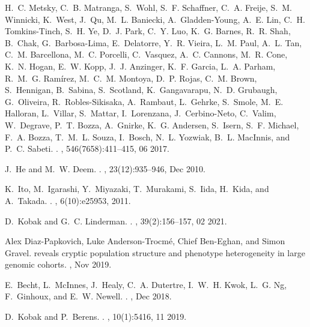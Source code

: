 \documentclass[webpdf,contemporary,large,single]{oup-authoring-template}%
\theoremstyle{thmstyleone}%
\theoremstyle{thmstyletwo}%
\theoremstyle{thmstylethree}%
\begin{document}
\begin{thebibliography}{10}
H.~C. Metsky, C.~B. Matranga, S.~Wohl, S.~F. Schaffner, C.~A. Freije, S.~M.
  Winnicki, K.~West, J.~Qu, M.~L. Baniecki, A.~Gladden-Young, A.~E. Lin, C.~H.
  Tomkins-Tinch, S.~H. Ye, D.~J. Park, C.~Y. Luo, K.~G. Barnes, R.~R. Shah,
  B.~Chak, G.~Barbosa-Lima, E.~Delatorre, Y.~R. Vieira, L.~M. Paul, A.~L. Tan,
  C.~M. Barcellona, M.~C. Porcelli, C.~Vasquez, A.~C. Cannons, M.~R. Cone,
  K.~N. Hogan, E.~W. Kopp, J.~J. Anzinger, K.~F. Garcia, L.~A. Parham, R.~M.~G.
  Ram\'{i}rez, M.~C.~M. Montoya, D.~P. Rojas, C.~M. Brown, S.~Hennigan,
  B.~Sabina, S.~Scotland, K.~Gangavarapu, N.~D. Grubaugh, G.~Oliveira,
  R.~Robles-Sikisaka, A.~Rambaut, L.~Gehrke, S.~Smole, M.~E. Halloran,
  L.~Villar, S.~Mattar, I.~Lorenzana, J.~Cerbino-Neto, C.~Valim, W.~Degrave,
  P.~T. Bozza, A.~Gnirke, K.~G. Andersen, S.~Isern, S.~F. Michael, F.~A. Bozza,
  T.~M.~L. Souza, I.~Bosch, N.~L. Yozwiak, B.~L. MacInnis, and P.~C. Sabeti.
.
, 546(7658):411--415, 06 2017.

J.~He and M.~W. Deem.
.
, 23(12):935--946, Dec 2010.

K.~Ito, M.~Igarashi, Y.~Miyazaki, T.~Murakami, S.~Iida, H.~Kida, and A.~Takada.
.
, 6(10):e25953, 2011.

D.~Kobak and G.~C. Linderman.
.
, 39(2):156--157, 02 2021.

Alex Diaz-Papkovich, Luke Anderson-Trocm\'{e}, Chief Ben-Eghan, and Simon
  Gravel.
 reveals cryptic population structure and phenotype
  heterogeneity in large genomic cohorts.
, Nov 2019.

E.~Becht, L.~McInnes, J.~Healy, C.~A. Dutertre, I.~W.~H. Kwok, L.~G. Ng,
  F.~Ginhoux, and E.~W. Newell.
.
, Dec 2018.

D.~Kobak and P.~Berens.
.
, 10(1):5416, 11 2019.


\end{thebibliography}
\end{document}
